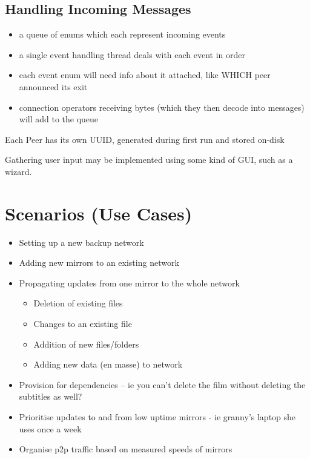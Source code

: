 \documentclass[12pt,a4paper,]{adreport}
\begin{document}
\section{Handling Incoming Messages}\label{handling-incoming-messages}

\begin{itemize}
\itemsep1pt\parskip0pt
\item
  a queue of enums which each represent incoming events
\item
  a single event handling thread deals with each event in order
\item
  each event enum will need info about it attached, like WHICH peer
  announced its exit
\item
  connection operators receiving bytes (which they then decode into
  messages) will add to the queue
\end{itemize}

Each Peer has its own UUID, generated during first run and stored
on-disk

Gathering user input may be implemented using some kind of GUI, such as
a wizard.

\chapter{Scenarios (Use Cases)}\label{scenarios-use-cases}

\begin{itemize}
\itemsep1pt\parskip0pt
\item
  Setting up a new backup network
\item
  Adding new mirrors to an existing network
\item
  Propagating updates from one mirror to the whole network

  \begin{itemize}
  \itemsep1pt\parskip0pt
  \item
    Deletion of existing files
  \item
    Changes to an existing file
  \item
    Addition of new files/folders
  \item
    Adding new data (en masse) to network
  \end{itemize}
\item
  Provision for dependencies -- ie you can't delete the film without
  deleting the subtitles as well?
\item
  Prioritise updates to and from low uptime mirrors - ie granny's laptop
  she uses once a week
\item
  Organise p2p traffic based on measured speeds of mirrors
\end{itemize}
\end{document}
